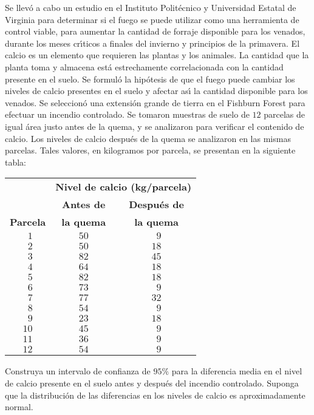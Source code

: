 \begin{enunciado}
 Se llev\'o a cabo un estudio en el Instituto Polit\'ecnico y Universidad Estatal de Virginia para determinar si el fuego se puede utilizar como una herramienta de control viable, para aumentar la cantidad de forraje disponible para los venados, durante los meses cr\'{\i}ticos a finales del invierno y principios de la primavera. El calcio es un elemento que requieren las plantas y los animales. La cantidad que la planta toma y almacena est\'a estrechamente correlacionada con la cantidad presente en el suelo. Se formul\'o la hip\'otesis de que el fuego puede cambiar los niveles de calcio presentes en el suelo y afectar as\'{\i} la cantidad disponible para los venados. Se seleccion\'o una extensi\'on grande de tierra en el Fishburn Forest para efectuar un incendio controlado. Se tomaron muestras de suelo de $12$ parcelas de igual \'area justo antes de la quema, y se analizaron para verificar el contenido de calcio. Los niveles de calcio despu\'es de la quema se analizaron en las mismas parcelas. Tales valores, en kilogramos por parcela, se presentan en la siguiente tabla:
 \begin{center}
  \begin{tabular}{ccc}
   & \multicolumn{2}{c}{\hspace{-0.5cm} \textbf{Nivel de calcio (kg/parcela)}} \\
   & \textbf{Antes de} & \textbf{Despu\'es de} \\
   \textbf{Parcela} & \textbf{la quema} & \textbf{la quema} \\
   \hline 
   $\phantom{1}1$ & $50$ &  $\phantom{1}9$ \\
   $\phantom{1}2$ & $50$ & $18$ \\
   $\phantom{1}3$ & $82$ & $45$ \\
   $\phantom{1}4$ & $64$ & $18$ \\
   $\phantom{1}5$ & $82$ & $18$ \\
   $\phantom{1}6$ & $73$ & $\phantom{1}9$ \\
   $\phantom{1}7$ & $77$ & $32$ \\
   $\phantom{1}8$ & $54$ & $\phantom{1}9$ \\
   $\phantom{1}9$ & $23$ & $18$ \\
   $10$ & $45$ & $\phantom{1}9$ \\
   $11$ & $36$ & $\phantom{1}9$ \\
   $12$ & $54$ & $\phantom{1}9$ \\
  \end{tabular}
 \end{center}
 Construya un intervalo de confianza de $95\%$ para la diferencia media en el nivel de calcio presente en el suelo antes y despu\'es del incendio controlado. Suponga que la distribuci\'on de las diferencias en los niveles de calcio es aproximadamente normal.
\end{enunciado}

